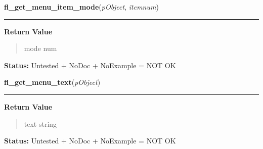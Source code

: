     \label{xformslib:library:fl_get_menu_item_mode}

    \vspace{0.5ex}

\hspace{.8\funcindent}\begin{boxedminipage}{\funcwidth}

    \raggedright \textbf{fl\_get\_menu\_item\_mode}(\textit{pObject}, \textit{itemnum})

    \vspace{-1.5ex}

    \rule{\textwidth}{0.5\fboxrule}
\setlength{\parskip}{2ex}
\setlength{\parskip}{1ex}
      \textbf{Return Value}
    \vspace{-1ex}

      \begin{quote}
      mode num

      \end{quote}

\textbf{Status:} Untested + NoDoc + NoExample = NOT OK



    \end{boxedminipage}

    \label{xformslib:library:fl_get_menu_text}

    \vspace{0.5ex}

\hspace{.8\funcindent}\begin{boxedminipage}{\funcwidth}

    \raggedright \textbf{fl\_get\_menu\_text}(\textit{pObject})

    \vspace{-1.5ex}

    \rule{\textwidth}{0.5\fboxrule}
\setlength{\parskip}{2ex}
\setlength{\parskip}{1ex}
      \textbf{Return Value}
    \vspace{-1ex}

      \begin{quote}
      text string

      \end{quote}

\textbf{Status:} Untested + NoDoc + NoExample = NOT OK



    \end{boxedminipage}

